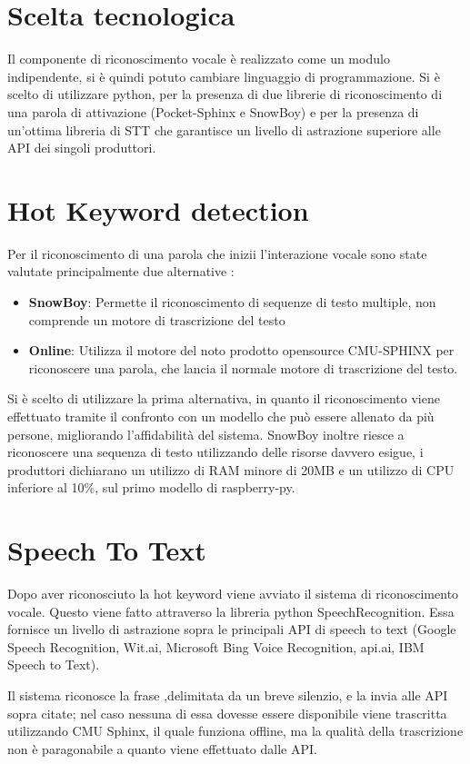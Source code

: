\documentclass[twoside]{supsistudent}
\begin{document}
\section{Scelta tecnologica}
Il componente di riconoscimento vocale è realizzato come un modulo indipendente, si è quindi potuto cambiare linguaggio di programmazione.
Si è scelto di utilizzare python, per la presenza di due librerie di riconoscimento di una parola di attivazione (Pocket-Sphinx e SnowBoy) e per la presenza di un'ottima libreria di STT che garantisce un livello di astrazione superiore alle API dei singoli produttori.

\section{Hot Keyword detection}

Per il riconoscimento di una parola che inizii l'interazione vocale sono state valutate principalmente due alternative :
\begin{itemize}
	\item \textbf{SnowBoy}: Permette il riconoscimento di sequenze di testo multiple, non comprende un motore di trascrizione del testo \cite{snowboy}
	\item \textbf{Online}: Utilizza il motore del noto prodotto opensource CMU-SPHINX per riconoscere una parola, che lancia il normale motore di trascrizione del testo.\cite{cmusphinx}
\end{itemize}
Si è scelto di utilizzare la prima alternativa, in quanto il riconoscimento viene effettuato tramite il confronto con un modello che può essere allenato da più persone, migliorando l'affidabilità del sistema. SnowBoy inoltre riesce a riconoscere una sequenza di testo utilizzando delle risorse davvero esigue, i produttori dichiarano un utilizzo di RAM minore di 20MB e un utilizzo di CPU inferiore al 10\%,  sul primo modello di raspberry-py. \cite{snowboy-cpu-usage}
\section{Speech To Text}
Dopo aver riconosciuto la hot keyword viene avviato il sistema di riconoscimento vocale. Questo viene fatto attraverso la libreria python SpeechRecognition. Essa fornisce un livello di astrazione sopra le principali API di speech to text (Google Speech Recognition, Wit.ai, Microsoft Bing Voice Recognition, api.ai, IBM Speech to Text).\cite{python-Speech-Recognizer}

Il sistema riconosce la frase ,delimitata da un breve silenzio, e la invia alle API sopra citate; nel caso nessuna di essa dovesse essere disponibile viene trascritta utilizzando CMU Sphinx, il quale funziona offline, ma la qualità della trascrizione non è paragonabile a quanto viene effettuato dalle API.
\end{document}
